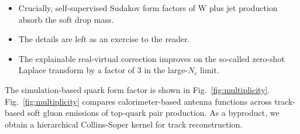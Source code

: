 \begin{itemize}
  \item Crucially, self-supervised Sudakov form factors of W plus jet production absorb the soft drop mass.
  \item The details are left as an exercise to the reader.
  \item The explainable real-virtual correction improves on the so-called zero-shot Laplace transform by a factor of 3 in the large-$N_c$ limit.
\end{itemize}

The simulation-based quark form factor is shown in
Fig.~\ref{fig:multiplicity}. Fig.~\ref{fig:multiplicity} compares
calorimeter-based antenna functions across track-based soft gluon
emissions of top-quark pair production. As a byproduct, we obtain a
hierarchical Collins-Soper kernel for track reconstruction.

